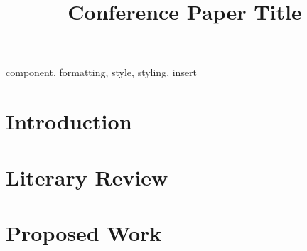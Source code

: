 \documentclass[conference]{IEEEtran}
\begin{document}
\title{Conference Paper Title}

\author{
}

\maketitle

\begin{abstract}


\end{abstract}

\begin{IEEEkeywords}
component, formatting, style, styling, insert
\end{IEEEkeywords}

\section{Introduction}
\label{sec:intro}


\section{Literary Review}
\label{sec:lit-rev}


\section{Proposed Work}






\printbibliography
\end{document}
